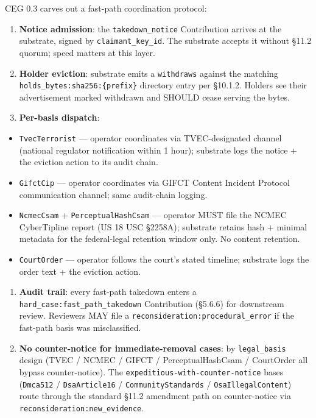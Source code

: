 \documentclass[10pt]{article}
\begin{document}
CEG 0.3 carves out a fast-path coordination protocol:


\begin{enumerate}\setlength\itemsep{0pt}
\item \textbf{Notice admission}: the \texttt{takedown\_notice} Contribution arrives at the substrate, signed by \texttt{claimant\_key\_id}. The substrate accepts it without §11.2 quorum; speed matters at this layer.
\item \textbf{Holder eviction}: substrate emits a \texttt{withdraws} against the matching \texttt{holds\_bytes:sha256:\{prefix\}} directory entry per §10.1.2. Holders see their advertisement marked withdrawn and SHOULD cease serving the bytes.
\item \textbf{Per-basis dispatch}:
\end{enumerate}

\begin{itemize}\setlength\itemsep{0pt}
\item \texttt{TvecTerrorist} — operator coordinates via TVEC-designated channel (national regulator notification within 1 hour); substrate logs the notice + the eviction action to its audit chain.
\item \texttt{GifctCip} — operator coordinates via GIFCT Content Incident Protocol communication channel; same audit-chain logging.
\item \texttt{NcmecCsam} + \texttt{PerceptualHashCsam} — operator MUST file the NCMEC CyberTipline report (US 18 USC §2258A); substrate retains hash + minimal metadata for the federal-legal retention window only. No content retention.
\item \texttt{CourtOrder} — operator follows the court's stated timeline; substrate logs the order text + the eviction action.
\end{itemize}

\begin{enumerate}\setlength\itemsep{0pt}
\item \textbf{Audit trail}: every fast-path takedown enters a \texttt{hard\_case:fast\_path\_takedown} Contribution (§5.6.6) for downstream review. Reviewers MAY file a \texttt{reconsideration:procedural\_error} if the fast-path basis was misclassified.
\item \textbf{No counter-notice for immediate-removal cases}: by \texttt{legal\_basis} design (TVEC / NCMEC / GIFCT / PerceptualHashCsam / CourtOrder all bypass counter-notice). The \texttt{expeditious-with-counter-notice} bases (\texttt{Dmca512} / \texttt{DsaArticle16} / \texttt{CommunityStandards} / \texttt{OsaIllegalContent}) route through the standard §11.2 amendment path on counter-notice via \texttt{reconsideration:new\_evidence}.
\end{enumerate}
\end{document}
